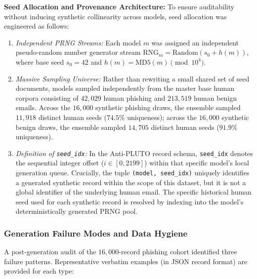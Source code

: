 \documentclass[journal]{IEEEtran}
\begin{document}
\textbf{Seed Allocation and Provenance Architecture:} To ensure auditability without inducing synthetic collinearity across models, seed allocation was engineered as follows:
\begin{enumerate}
    \item \textit{Independent PRNG Streams:} Each model $m$ was assigned an independent pseudo-random number generator stream $\text{RNG}_m = \text{Random}(s_0 + h(m))$, where base seed $s_0 = 42$ and $h(m) = \text{MD5}(m) \pmod{10^4}$.
    \item \textit{Massive Sampling Universe:} Rather than rewriting a small shared set of seed documents, models sampled independently from the master base human corpora consisting of $42{,}029$ human phishing and $213{,}519$ human benign emails. Across the $16{,}000$ synthetic phishing draws, the ensemble sampled $11{,}918$ distinct human seeds ($74.5\%$ uniqueness); across the $16{,}000$ synthetic benign draws, the ensemble sampled $14{,}705$ distinct human seeds ($91.9\%$ uniqueness).
    \item \textit{Definition of \texttt{seed\_idx}:} In the Anti-PLUTO record schema, \texttt{seed\_idx} denotes the sequential integer offset ($i \in [0, 2199]$) within that specific model's local generation queue. Crucially, the tuple \texttt{(model, seed\_idx)} uniquely identifies a generated synthetic record within the scope of this dataset, but it is not a global identifier of the underlying human email. The specific historical human seed used for each synthetic record is resolved by indexing into the model's deterministically generated PRNG pool.
\end{enumerate}

\subsubsection{Generation Failure Modes and Data Hygiene}
A post-generation audit of the $16{,}000$-record phishing cohort identified three failure patterns. Representative verbatim examples (in JSON record format) are provided for each type:
\end{document}
